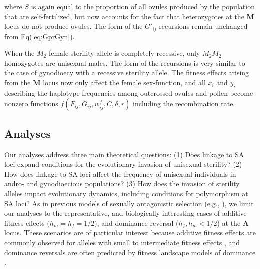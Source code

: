 \documentclass[9pt,twocolumn,twoside,lineno]{gsajnl}
\begin{document}
\noindent where $S$ is again equal to the proportion of all ovules produced by the population that are self-fertilized, but now accounts for the fact that heterozygotes at the $\mathbf{M}$ locus do not produce ovules. The form of the $G'_{ij}$ recursions remain unchanged from Eq(\ref{eq:GprGyn}).

When the $M_2$ female-sterility allele is completely recessive, only $M_2M_2$ homozygotes are unisexual males. The form of the recursions is very similar to the case of gynodioecy with a recessive sterility allele. The fitness effects arising from the $\mathbf{M}$ locus now only affect the female sex-function, and all $x_i$ and $y_i$ describing the haplotype frequencies among outcrossed ovules and pollen become nonzero functions $f(F_{ij},G_{ij},w^f_{ij},C,\delta,r)$ including the recombination rate.


\subsection{Analyses} \label{subsec:analyses}

Our analyses address three main theoretical questions: (1) Does linkage to SA loci expand conditions for the evolutionary invasion of unisexual sterility? (2) How does linkage to SA loci affect the frequency of unisexual individuals in andro- and gynodioecious populations? (3) How does the invasion of sterility alleles impact evolutionary dynamics, including conditions for polymorphism at SA loci? As in previous models of sexually antagonistic selection (e.g., \citealp{Kidwell1977,Prout2000,JordanConnallon2014}), we limit our analyses to the representative, and biologically interesting cases of additive fitness effects ($h_m = h_f = 1/2$), and dominance reversal ($h_f,h_m < 1/2$) at the $\mathbf{A}$ locus. These scenarios are of particular interest because additive fitness effects are commonly observed for alleles with small to intermediate fitness effects \citep{Agrawal2011}, and dominance reversals are often predicted by fitness landscape models of dominance \citep{Manna2011, ConnallonClark2014}.
\end{document}
